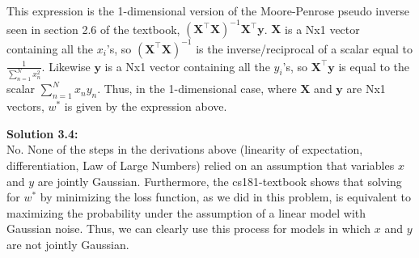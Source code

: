 \documentclass[submit]{harvardml}
\begin{document}
\noindent This expression is the 1-dimensional version of the Moore-Penrose pseudo inverse seen in section 2.6 of the textbook, $(\mathbf{X}^\top \mathbf{X})^{-1} \mathbf{X}^\top \mathbf{y}$. $\mathbf{X}$ is a Nx1 vector containing all the $x_i$'s, so $(\mathbf{X}^\top \mathbf{X})^{-1}$ is the inverse/reciprocal of a scalar equal to $\frac{1}{\sum_{n=1}^{N} x_n^2}$. Likewise $\mathbf{y}$ is a Nx1 vector containing all the $y_i$'s, so $\mathbf{X}^\top \mathbf{y}$ is equal to the scalar $\sum_{n=1}^{N} x_n y_n$. Thus, in the 1-dimensional case, where $\mathbf{X}$ and $\mathbf{y}$ are Nx1 vectors, $w^*$ is given by the expression above.

\bigskip
\noindent\textbf{Solution 3.4:}\\
No. None of the steps in the derivations above (linearity of expectation, differentiation, Law of Large Numbers) relied on an assumption that variables $x$ and $y$ are jointly Gaussian. Furthermore, the cs181-textbook shows that solving for $w^*$ by minimizing the loss function, as we did in this problem, is equivalent to maximizing the probability under the assumption of a linear model with Gaussian noise. Thus, we can clearly use this process for models in which $x$ and $y$ are not jointly Gaussian.


\end{document}
